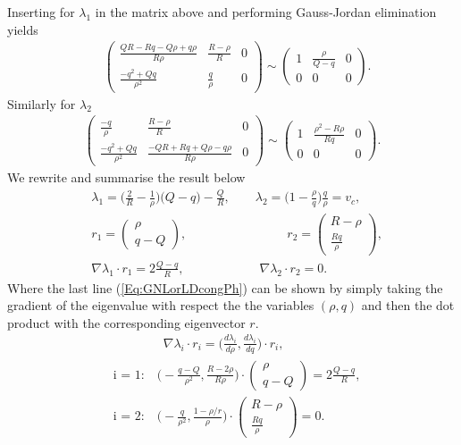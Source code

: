 \documentclass[10pt]{article}
\numberwithin{equation}{section}
\begin{document}
Inserting for $\lambda_1$ in the matrix above and performing Gauss-Jordan elimination yields 
\begin{align*}
   & \left(\begin{array}{cc|c}
\frac{QR-Rq-Q\rho+q\rho}{R\rho} & \frac{R-\rho}{R} & 0 \\
\frac{-q^2+Qq}{\rho^2} & \frac{q}{\rho} & 0
\end{array}\right) \sim  \left(\begin{array}{cc|c}
1 & \frac{\rho}{Q-q} & 0 \\
0 & 0 & 0
\end{array}\right).
\end{align*}
Similarly for $\lambda_2$
\begin{align*}
    \left(\begin{array}{cc|c}
\frac{-q}{\rho} & \frac{R-\rho}{R} & 0\\
\frac{-q^2+Qq}{\rho^2} & \frac{-QR+Rq+Q\rho-q\rho}{R\rho} & 0
\end{array}\right) \sim \left(\begin{array}{cc|c}
1 & \frac{\rho^2-R\rho}{Rq} & 0 \\
0 & 0 & 0
\end{array}\right).
\end{align*}
We rewrite and summarise the result below
\begin{align}
    &\lambda_1 = \big ( \frac{2}{R} - \frac{1}{\rho} )\big (Q- q) - \frac{Q}{R} , \quad \quad \lambda_2 = \big(1 - \frac{\rho}{q}\big)\frac{q}{\rho} = v_c , \label{Eq:EigenvaluesCongestedPhase} \\
    & r_1 = \begin{pmatrix} \rho \\ q - Q \end{pmatrix}, \quad \quad \quad  \quad \quad \quad \quad \quad  r_2 = \begin{pmatrix} R - \rho \\ \frac{Rq}{\rho} \end{pmatrix} , \label{Eq:EigenvectorsCongPh} \\
    & \nabla \lambda_1 \cdot r_1 = 2\frac{Q-q}{R}, \quad \quad \quad \quad \quad  \quad \nabla \lambda_2 \cdot r_2 = 0 . \label{Eq:GNLorLDcongPh}
\end{align}
Where the last line (\ref{Eq:GNLorLDcongPh}) can be shown by simply taking the gradient of the eigenvalue with respect the the variables $(\rho,q)$ and then the dot product with the corresponding eigenvector $r$.
\begin{align*}
    & \quad \quad \quad \quad  \nabla \lambda_i \cdot r_i = \big( \frac{d\lambda_i}{d\rho}, \frac{d\lambda_i}{dq}\big) \cdot r_i, \\
    & \text{i = 1:} \quad \big(- \frac{q-Q}{\rho^2}, \frac{R-2\rho}{R\rho} \big) \cdot \begin{pmatrix} \rho \\ q - Q \end{pmatrix} = 2 \frac{Q-q}{R}, \\
    & \text{i = 2:} \quad \big(- \frac{q}{\rho^2}, \frac{1-\rho/r}{\rho}\big) \cdot \begin{pmatrix} R - \rho \\ \frac{Rq}{\rho} \end{pmatrix} = 0 .
\end{align*}
\end{document}
